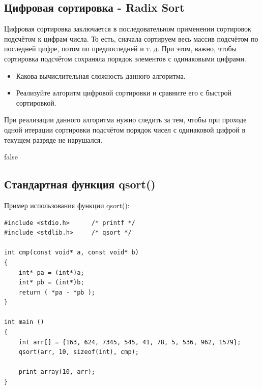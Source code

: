 \documentclass{article}
\begin{document}
\subsection*{Цифровая сортировка - Radix Sort}
Цифровая сортировка заключается в последовательном применении сортировок подсчётом к цифрам числа. То есть, сначала сортируем весь массив подсчётом по последней цифре, потом по предпоследней и т. д. При этом, важно, чтобы сортировка подсчётом сохраняла порядок элементов с одинаковыми цифрами.
\begin{itemize}
\item Какова вычислительная сложность данного алгоритма.
\item Реализуйте алгоритм цифровой сортировки и сравните его с быстрой сортировкой.
\end{itemize}
При реализации данного алгоритма нужно следить за тем, чтобы при проходе одной итерации сортировки подсчётом порядок чисел с одинаковой цифрой в текущем разряде не нарушался.
\newpage


\if false
\subsection*{Стандартная функция qsort()}

Пример использования функции qsort():
\begin{verbatim}
#include <stdio.h>      /* printf */
#include <stdlib.h>     /* qsort */

int cmp(const void* a, const void* b)
{
    int* pa = (int*)a;
    int* pb = (int*)b;
    return ( *pa - *pb );
}

int main ()
{
    int arr[] = {163, 624, 7345, 545, 41, 78, 5, 536, 962, 1579};
    qsort(arr, 10, sizeof(int), cmp);
   
    print_array(10, arr);
}
\end{verbatim}
\end{document}

